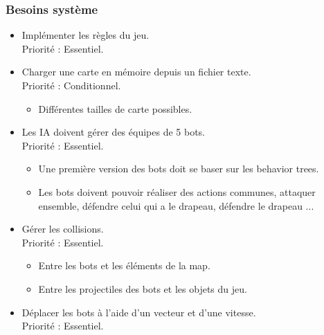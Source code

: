 \documentclass[french]{article}
\begin{document}
\subsubsection{Besoins système}
    
    \begin{itemize}
        
        \item Implémenter les règles du jeu. \\
                Priorité : Essentiel.\\
        
        \item Charger une carte en mémoire depuis un fichier texte. \\
                Priorité : Conditionnel.
                \begin{itemize}
                    \item Différentes tailles de carte possibles. \\
                \end{itemize}


        \item Les IA doivent gérer des équipes de 5 bots. \\
                Priorité : Essentiel.
                \begin{itemize}
                    \item Une première version des bots doit se baser sur les behavior trees. 
                    \item Les bots doivent pouvoir réaliser des actions communes, attaquer ensemble, défendre celui qui a le drapeau, défendre le drapeau ...\\
                \end{itemize}


        \item Gérer les collisions. \\
                Priorité : Essentiel.
                \begin{itemize}
                    \item Entre les bots et les éléments de la map.
                    \item Entre les projectiles des bots et les objets du jeu.\\
                \end{itemize}
                
        
        \item Déplacer les bots à l'aide d'un vecteur et d'une vitesse.\\
                Priorité : Essentiel.\\
                

\end{itemize}
\end{document}
